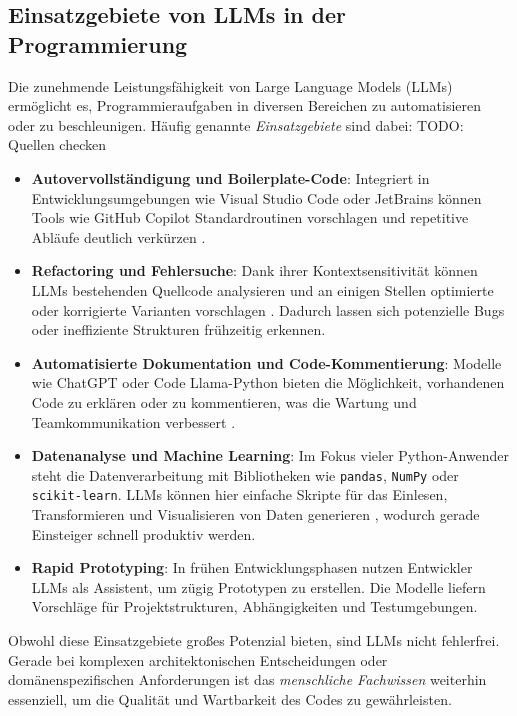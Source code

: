 \documentclass[11pt,a4paper]{article}
\begin{document}
\subsection{Einsatzgebiete von LLMs in der Programmierung}
\label{sec:einsatzgebiete}

Die zunehmende Leistungsfähigkeit von Large Language Models (LLMs) ermöglicht es, Programmieraufgaben in diversen Bereichen zu automatisieren oder zu beschleunigen. Häufig genannte \emph{Einsatzgebiete} sind dabei:
TODO: Quellen checken
\begin{itemize}
  \item \textbf{Autovervollständigung und Boilerplate-Code}:  
  Integriert in Entwicklungsumgebungen wie Visual Studio Code oder JetBrains können Tools wie GitHub Copilot Standardroutinen vorschlagen und repetitive Abläufe deutlich verkürzen \cite{Li2022AlphaCode}.

  \item \textbf{Refactoring und Fehlersuche}:  
  Dank ihrer Kontextsensitivität können LLMs bestehenden Quellcode analysieren und an einigen Stellen optimierte oder korrigierte Varianten vorschlagen \cite{Zhang2023CodexRevisited}. Dadurch lassen sich potenzielle Bugs oder ineffiziente Strukturen frühzeitig erkennen.

  \item \textbf{Automatisierte Dokumentation und Code-Kommentierung}:  
  Modelle wie ChatGPT oder Code Llama-Python bieten die Möglichkeit, vorhandenen Code zu erklären oder zu kommentieren, was die Wartung und Teamkommunikation verbessert \cite{Phung2023MultiTask}.

  \item \textbf{Datenanalyse und Machine Learning}:  
  Im Fokus vieler Python-Anwender steht die Datenverarbeitung mit Bibliotheken wie \texttt{pandas}, \texttt{NumPy} oder \texttt{scikit-learn}. LLMs können hier einfache Skripte für das Einlesen, Transformieren und Visualisieren von Daten generieren \cite{Wang2023DataCentric}, wodurch gerade Einsteiger schnell produktiv werden.

  \item \textbf{Rapid Prototyping}:  
  In frühen Entwicklungsphasen nutzen Entwickler LLMs als Assistent, um zügig Prototypen zu erstellen. Die Modelle liefern Vorschläge für Projektstrukturen, Abhängigkeiten und Testumgebungen.
\end{itemize}

Obwohl diese Einsatzgebiete großes Potenzial bieten, sind LLMs nicht fehlerfrei. Gerade bei komplexen architektonischen Entscheidungen oder domänenspezifischen Anforderungen ist das \emph{menschliche Fachwissen} weiterhin essenziell, um die Qualität und Wartbarkeit des Codes zu gewährleisten.
\end{document}
